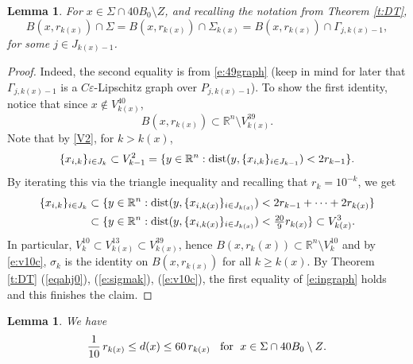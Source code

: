 \documentclass[11pt]{amsart}
\newcommand{\dist}{{\rm dist}}
\newcommand{\rf}[1]{{(\ref{#1})}}
\newcommand{\ve}{{\varepsilon}}
\newtheorem{lemma}[theorem]{Lemma}
\theoremstyle{definition}
\theoremstyle{remark}
\numberwithin{equation}{section}
\def\bR{{\mathbb{R}}}
\def\bR{\mathbb{R}}
\begin{document}
\begin{lemma}\label{lem6.3}
For $x\in \Sigma\cap 40B_{0}\setminus Z$, and recalling the notation from Theorem \ref{t:DT}, 
\begin{equation}
\label{e:ingraph}
B(x,r_{k(x)}) \cap \Sigma = B(x,r_{k(x)})\cap \Sigma_{k(x)}=B(x,r_{k(x)})\cap  \Gamma_{j,k(x)-1},
\end{equation}
for some $j\in J_{ k(x)-1}$.
\end{lemma}
\begin{proof}
Indeed, the second equality is from \eqref{e:49graph} (keep in mind for later that $\Gamma_{j,k(x)-1}$ is a $C\ve$-Lipschitz graph over $P_{j,k(x)-1}$). To show the first identity, notice that since $x\not\in V_{k(x)}^{40}$, 
\[
B(x,r_{k(x)})\subset \bR^{n}\setminus V_{k(x)}^{39}.\]
Note that by \eqref{V2}, for $k>k(x)$,
\[
\{x_{i,k}\}_{i\in J_{k}}
\subset V_{k-1}^{2} = \{y\in \bR^{n}: \dist(y,\{x_{i,k}\}_{i\in J_{k-1}})<2r_{k-1}\}.
\]
By iterating this via the triangle inequality and recalling that $r_{k}=10^{-k}$, we get
\begin{align*}
\{x_{i,k}\}_{i\in J_{k}}
& \subset \{y\in \bR^{n}: \dist(y,\{x_{i,k(x)}\}_{i\in J_{k(x)}})<2r_{k-1}+\cdots + 2r_{k(x)}\}\\
& \subset\{y\in \bR^{n}: \dist(y,\{x_{i,k(x)}\}_{i\in J_{k(x)}})<\tfrac{20}{9}r_{k(x)}\}
\subset V_{k(x)}^{3}.
\end{align*}
In particular, $V_{k}^{10}\subset V_{k(x)}^{13}\subset V_{k(x)}^{39}$, hence $B(x,r_{k}(x))\subset \bR^{n}\setminus V_{k}^{10}$ and by \eqref{e:v10c}, $\sigma_{k}$ is the identity on $B(x,r_{k(x)})$ for all $k\geq k(x)$. By Theorem \ref{t:DT} \rf{eqahj0}, \rf{e:sigmak}, \rf{e:v10c}, the first equality of \eqref{e:ingraph} holds and this finishes the claim. 
\end{proof}


\begin{lemma}\label{lem6.4}
We have
\begin{equation}
\label{e:rsimd}
 \frac1{10}\,r_{k(x)}\leq d(x)\leq 60\,r_{k(x)} \;\;\mbox{ for \;$x\in \Sigma\cap  40 B_{0}\setminus Z$}.
\end{equation}
\end{lemma}
\end{document}
